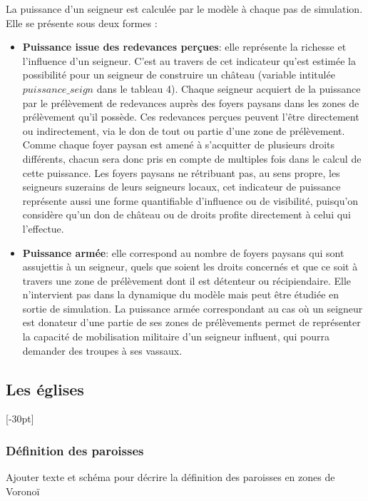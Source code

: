 La puissance d'un seigneur est calculée par le modèle à chaque pas de simulation.
Elle se présente sous deux formes :
\begin{itemize}
\item \textbf{Puissance issue des redevances perçues}: elle représente la richesse et l'influence d'un seigneur.
C'est au travers de cet indicateur qu'est estimée la possibilité pour un seigneur de construire un château (variable intitulée $puissance\_seign$ dans le tableau 4).
Chaque seigneur acquiert de la puissance par le prélèvement de redevances auprès des foyers paysans dans les zones de prélèvement qu'il possède.
Ces redevances perçues peuvent l'être directement ou indirectement, via le don de tout ou partie d'une zone de prélèvement.
Comme chaque foyer paysan est amené à s'acquitter de plusieurs droits différents, chacun sera donc pris en compte de multiples fois dans le calcul de cette puissance.
Les foyers paysans ne rétribuant pas, au sens propre, les seigneurs suzerains de leurs seigneurs locaux, cet indicateur de puissance représente aussi une forme quantifiable d'influence ou de visibilité, puisqu'on considère qu'un don de château ou de droits profite directement à celui qui l'effectue.

\item \textbf{Puissance armée}: elle correspond au nombre de foyers paysans qui sont assujettis à un seigneur, quels que soient les droits concernés et que ce soit à travers une zone de prélèvement dont il est détenteur ou récipiendaire.
Elle n'intervient pas dans la dynamique du modèle mais peut être étudiée en sortie de simulation.
La puissance armée correspondant au cas où un seigneur est donateur d'une partie de ses zones de prélèvements permet de représenter la capacité de mobilisation militaire d'un seigneur influent, qui pourra demander des troupes à ses vassaux.
\end{itemize}


\clearpage
\subsection{Les églises}[-30pt]

\subsubsection{Définition des paroisses}

{\blueroman Ajouter texte et schéma pour décrire la définition des paroisses en zones de Voronoï}

